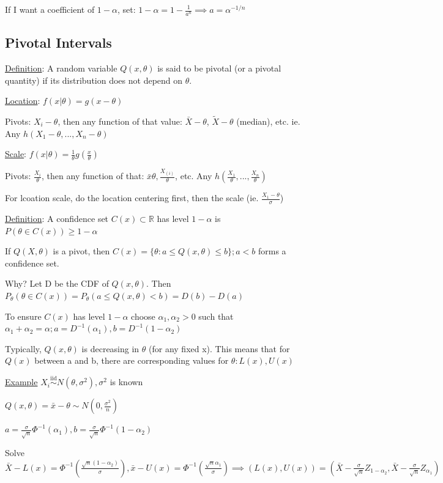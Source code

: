 \documentclass{article}
\newcommand{\real}{\mathbb{R}} %
\newcommand{\iiddist}{\overset{\mathrm{iid}}{\sim}}
\begin{document}
If I want a coefficient of $1-\alpha$, set: $1-\alpha = 1 - \frac{1}{a^n} \implies a = \alpha^{-1/n}$

\subsection{Pivotal Intervals}

\underline{Definition}: A random variable $Q(x, \theta)$ is said to be pivotal (or a pivotal quantity) if its distribution does not depend on $\theta$.

\underline{Location}: $f(x|\theta) = g(x-\theta)$

Pivots: $X_i - \theta$, then any function of that value: $\bar{X} - \theta$, $\tilde{X} - \theta$ (median), etc. ie. Any $h(X_1 - \theta, ..., X_n-\theta)$

\underline{Scale}: $f(x|\theta) = \frac{1}{\theta}g(\frac{x}{\theta})$

Pivots: $\frac{X_i}{\theta}$, then any function of that: $\bar{x}{\theta}, \frac{X_{(i)}}{\theta}$, etc. Any $h(\frac{X_1}{\theta}, ..., \frac{X_n}{\theta})$

For lcoation scale, do the location centering first, then the scale (ie. $\frac{X_1 - \theta}{\sigma}$)

\underline{Definition}: A confidence set $C(x) \subset \real$ has level $1-\alpha$ is $P(\theta \in C(x)) \ge 1-\alpha$

If $Q(X,\theta)$ is a pivot, then $C(x) = \{\theta: a \le Q(x, \theta) \le b \}; a < b$ forms a confidence set. 

Why? Let D be the CDF of $Q(x,\theta)$. Then $P_{\theta}(\theta \in C(x)) = P_{\theta}(a \le Q(x,\theta) < b) = D(b) - D(a)$

To ensure $C(x)$ has level $1-\alpha$ choose $\alpha_1, \alpha_2 > 0$ such that $\alpha_1 + \alpha_2 = \alpha; a = D^{-1}(\alpha_1), b = D^{-1}(1-\alpha_2)$

Typically, $Q(x,\theta)$ is decreasing in $\theta$ (for any fixed x). This means that for $Q(x)$ between a and b, there are corresponding values for $\theta: L(x), U(x)$

\underline{Example} $X_i \iiddist N(\theta, \sigma^2), \sigma^2$ is known

$Q(x,\theta) = \bar{x}-\theta \sim N(0, \frac{\sigma^2}{n})$

$a = \frac{\sigma}{\sqrt{n}}\Phi^{-1}(\alpha_1), b = \frac{\sigma}{\sqrt{n}}\Phi^{-1}(1-\alpha_2)$

Solve $\bar{X} - L(x) = \Phi^{-1}(\frac{\sqrt{n}(1-\alpha_2)}{\sigma}), \bar{x} - U(x) = \Phi^{-1}(\frac{\sqrt{n}\alpha_1}{\sigma}) \implies (L(x), U(x)) = (\bar{X} -\frac{\sigma}{\sqrt{n}}Z_{1-\alpha_2}, \bar{X} - \frac{\sigma}{\sqrt{n}}Z_{\alpha_1})$
\end{document}
